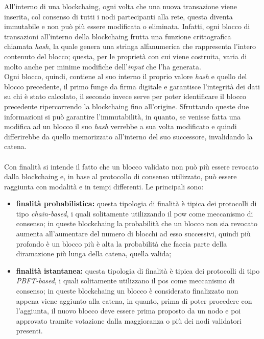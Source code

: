 All'interno di una \gls{blockchaing}, ogni volta che una nuova transazione viene inserita, col consenso di tutti i nodi partecipanti alla rete, questa diventa immutabile e non può più essere modificata o eliminata. Infatti, ogni blocco di transazioni all'interno della \gls{blockchaing} frutta una funzione crittografica chiamata \textit{hash}, la quale genera una stringa alfanumerica che rappresenta l'intero contenuto del blocco; questa, per le proprietà con cui viene costruita, varia di molto anche per minime modifiche dell'\textit{input} che l'ha generata.\\
Ogni blocco, quindi, contiene al suo interno il proprio valore \textit{hash} e quello del blocco precedente, il primo funge da firma digitale e garantisce l'integrità dei dati su chi è stato calcolato, il secondo invece serve per poter identificare il blocco precedente ripercorrendo la \gls{blockchaing} fino all'origine. Sfruttando queste due informazioni si può garantire l'immutabilità, in quanto, se venisse fatta una modifica ad un blocco il suo \textit{hash} verrebbe a sua volta modificato e quindi differirebbe da quello memorizzato all'interno del suo successore, invalidando la catena.
\\\\
Con finalità si intende il fatto che un blocco validato non può più essere revocato dalla \gls{blockchaing} e, in base al protocollo di consenso utilizzato, può essere raggiunta con modalità e in tempi differenti. Le principali sono:

\begin{itemize}
	\item \textbf{finalità probabilistica:} questa tipologia di finalità è tipica dei protocolli di tipo \textit{chain-based}, i quali solitamente utilizzando il \gls{pow} come meccanismo di consenso; in queste \gls{blockchaing} la probabilità che un blocco non sia revocato aumenta all'aumentare del numero di blocchi ad esso successivi, quindi più profondo è un blocco più è alta la probabilità che faccia parte della diramazione più lunga della catena, quella valida;
	\item \textbf{finalità istantanea:} questa tipologia di finalità è tipica dei protocolli di tipo \textit{PBFT-based}, i 
	quali solitamente utilizzano il \gls{pos} come meccanismo di consenso; in queste \gls{blockchaing} un blocco è considerato finalizzato non appena viene aggiunto alla catena, in quanto, prima di poter procedere con l'aggiunta, il nuovo blocco deve essere prima proposto da un nodo e poi approvato tramite votazione dalla maggioranza o più dei nodi validatori presenti.
\end{itemize} 

